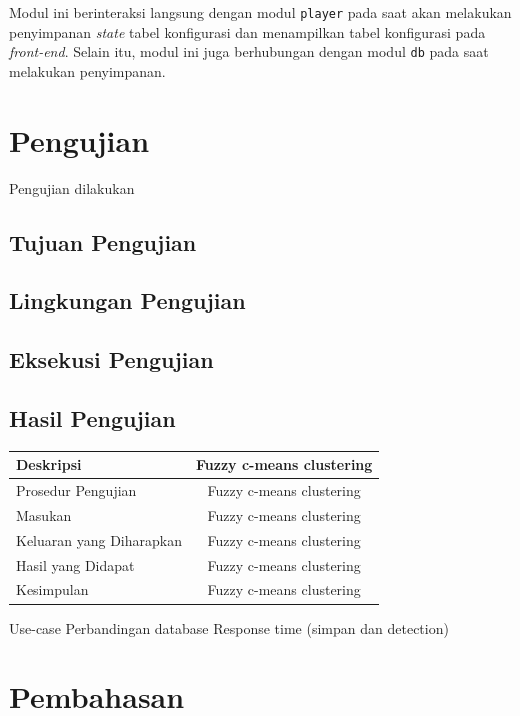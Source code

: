 	Modul ini berinteraksi langsung dengan modul \texttt{player} pada saat akan melakukan penyimpanan \textit{state} tabel konfigurasi dan menampilkan tabel konfigurasi pada \textit{front-end}. Selain itu, modul ini juga berhubungan dengan modul \texttt{db} pada saat melakukan penyimpanan.

\section{Pengujian}
Pengujian dilakukan 
\subsection{Tujuan Pengujian}

\subsection{Lingkungan Pengujian}

\subsection{Eksekusi Pengujian}

\subsection{Hasil Pengujian}


\begin{tabular}{|*{2}{l|}}
	\hline
	\multicolumn{1}{|l}{Deskripsi} & \multicolumn{1}{|c|}{Fuzzy c-means clustering} \\ \hline
	\multicolumn{1}{|l}{Prosedur Pengujian} & \multicolumn{1}{|c|}{Fuzzy c-means clustering} \\ \hline
	\multicolumn{1}{|l}{Masukan} & \multicolumn{1}{|c|}{Fuzzy c-means clustering} \\ \hline
	\multicolumn{1}{|l}{Keluaran yang Diharapkan} & \multicolumn{1}{|c|}{Fuzzy c-means clustering} \\ \hline
	\multicolumn{1}{|l}{Hasil yang Didapat} & \multicolumn{1}{|c|}{Fuzzy c-means clustering} \\ \hline
	\multicolumn{1}{|l}{Kesimpulan} & \multicolumn{1}{|c|}{Fuzzy c-means clustering} \\ \hline
\end{tabular}

Use-case
Perbandingan database
Response time (simpan dan detection)

\section{Pembahasan}
